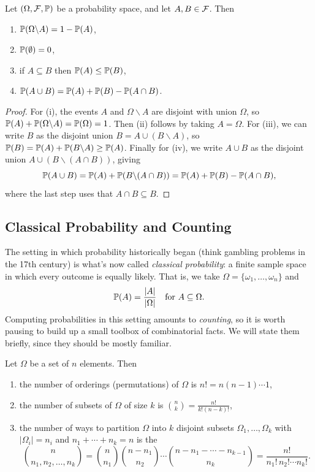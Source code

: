 \documentclass[a4paper]{scrartcl}
\begin{document}
\begin{proposition}
	Let $(\Omega, \mathcal{F}, \mathbb{P})$ be a probability space, and let $A, B \in \mathcal{F}$. Then
	\begin{enumerate}[label=(\roman*)]
		\item $\mathbb{P}(\Omega \backslash A) = 1 - \mathbb{P}(A)$,
		\item $\mathbb{P}(\emptyset) = 0$,
		\item if $A \subseteq B$ then $\mathbb{P}(A) \leq \mathbb{P}(B)$,
		\item $\mathbb{P}(A \cup B) = \mathbb{P}(A) + \mathbb{P}(B) - \mathbb{P}(A \cap B)$.
	\end{enumerate}
\end{proposition}
\begin{proof}
	For (i), the events $A$ and $\Omega \backslash A$ are disjoint with union $\Omega$, so $\mathbb{P}(A) + \mathbb{P}(\Omega \backslash A) = \mathbb{P}(\Omega) = 1$. Then (ii) follows by taking $A = \Omega$. For (iii), we can write $B$ as the disjoint union $B = A \cup (B \backslash A)$, so $\mathbb{P}(B) = \mathbb{P}(A) + \mathbb{P}(B \backslash A) \geq \mathbb{P}(A)$. Finally for (iv), we write $A \cup B$ as the disjoint union $A \cup (B \backslash (A \cap B))$, giving
	$$
	\mathbb{P}(A \cup B) = \mathbb{P}(A) + \mathbb{P}(B \backslash (A \cap B)) = \mathbb{P}(A) + \mathbb{P}(B) - \mathbb{P}(A \cap B),
	$$
	where the last step uses that $A \cap B \subseteq B$.
\end{proof}

\subsection{Classical Probability and Counting}

The setting in which probability historically began (think gambling problems in the 17th century) is what's now called \emph{classical probability}: a finite sample space in which every outcome is equally likely. That is, we take $\Omega = \{\omega_1, \dots, \omega_n\}$ and
$$
\mathbb{P}(A) = \frac{|A|}{|\Omega|} \quad \text{for } A \subseteq \Omega.
$$
Computing probabilities in this setting amounts to \emph{counting}, so it is worth pausing to build up a small toolbox of combinatorial facts. We will state them briefly, since they should be mostly familiar.

\begin{fact}
	Let $\Omega$ be a set of $n$ elements. Then
	\begin{enumerate}[label=(\roman*)]
		\item the number of orderings (permutations) of $\Omega$ is $n! = n(n-1) \cdots 1$,
		\item the number of subsets of $\Omega$ of size $k$ is $\binom{n}{k} = \frac{n!}{k!(n - k)!}$,
		\item the number of ways to partition $\Omega$ into $k$ disjoint subsets $\Omega_1, \dots, \Omega_k$ with $|\Omega_i| = n_i$ and $n_1 + \cdots + n_k = n$ is the 
		$$
		\binom{n}{n_1, n_2, \dots, n_k} = \binom{n}{n_1}\binom{n - n_1}{n_2} \cdots \binom{n - n_1 - \cdots - n_{k - 1}}{n_k} = \frac{n!}{n_1! \, n_2! \cdots n_k!}.
		$$
	\end{enumerate}
\end{fact}
\end{document}
